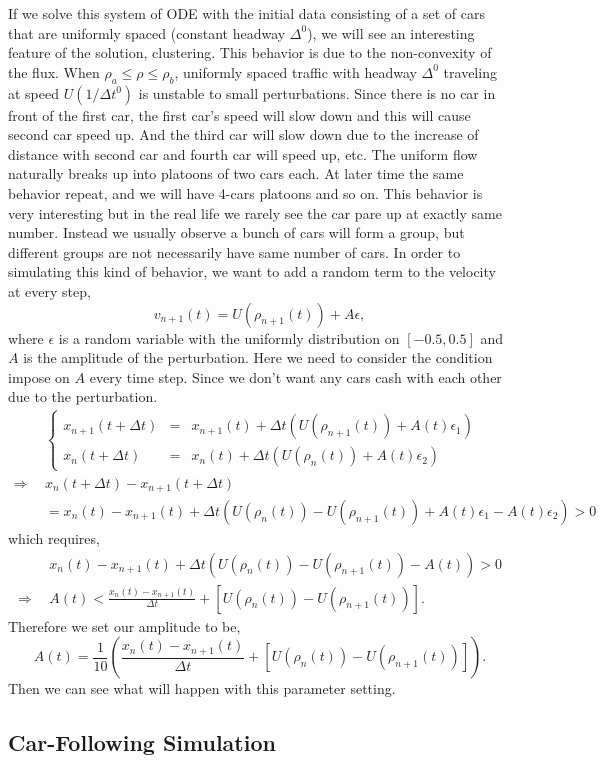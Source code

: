 \documentclass[10pt]{article}
\begin{document}
If we solve this system of ODE with the initial data consisting of a set of cars that are uniformly spaced (constant headway $\Delta^0$), we will see an interesting feature of the solution, clustering. This behavior is due to the non-convexity of the flux. When $\rho_a\leq\rho\leq\rho_b$, uniformly spaced traffic with headway $\Delta^0$ traveling at speed $U(1/\Delta t^0)$ is unstable to small perturbations. Since there is no car in front of the first car, the first car's speed will slow down and this will cause second car speed up. And the third car will slow down due to the increase of distance with second car and fourth car will speed up, etc. The uniform flow naturally breaks up into platoons of two cars each. At later time the same behavior repeat, and we will have 4-cars platoons and so on.
\vskip 8pt
This behavior is very interesting but in the real life we rarely see the car pare up at exactly same number. Instead we usually observe a bunch of cars will form a group, but different groups are not necessarily have same number of cars. In order to simulating this kind of behavior, we want to add a random term to the velocity at every step,
\[v_{n+1}(t)=U(\rho_{n+1}(t))+A\epsilon,\]
where $\epsilon$ is a random variable with the uniformly distribution on $[-0.5,0.5]$ and $A$ is the amplitude of the perturbation. Here we need to consider the condition impose on $A$ every time step. Since we don't want any cars cash with each other due to the perturbation.
\begin{align*}
&\left\{\begin{array}{lll}
x_{n+1}(t+\Delta t)&=&x_{n+1}(t)+\Delta t(U(\rho_{n+1}(t))+A(t)\epsilon_1)\\
x_{n}(t+\Delta t)&=&x_{n}(t)+\Delta t(U(\rho_{n}(t))+A(t)\epsilon_2)
\end{array}\right.\\
\Rightarrow~~&x_n(t+\Delta t)-x_{n+1}(t+\Delta t)\\
&=x_n(t)-x_{n+1}(t)+\Delta t(U(\rho_{n}(t))-U(\rho_{n+1}(t))+A(t)\epsilon_1-A(t)\epsilon_2)>0
\end{align*}
which requires,
\begin{align*}
&x_n(t)-x_{n+1}(t)+\Delta t(U(\rho_{n}(t))-U(\rho_{n+1}(t))-A(t))>0\\
\Rightarrow~~&A(t)<\frac{x_{n}(t)-x_{n+1}(t)}{\Delta t}+[U(\rho_{n}(t))-U(\rho_{n+1}(t))].
\end{align*}
Therefore we set our amplitude to be,
\[A(t)=\frac{1}{10}\left(\frac{x_{n}(t)-x_{n+1}(t)}{\Delta t}+[U(\rho_{n}(t))-U(\rho_{n+1}(t))]\right).\]
Then we can see what will happen with this parameter setting.
\subsection{Car-Following Simulation}
\end{document}

